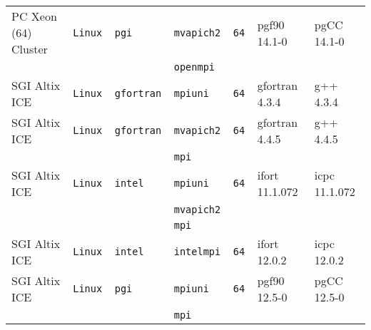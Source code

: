 \begin{longtable}{lllllll}
PC Xeon (64) Cluster  &\tt Linux  &\tt pgi          &\tt mvapich2   &\tt 64              & pgf90 \footnotesize 14.1-0         & pgCC \footnotesize 14.1-0       \\ %
                      &           &                 &\tt openmpi    &                    &                                    &                                 \\
SGI Altix ICE         &\tt Linux  &\tt gfortran     &\tt mpiuni     &\tt 64              & gfortran \footnotesize 4.3.4       & g++ \footnotesize 4.3.4         \\ %
SGI Altix ICE         &\tt Linux  &\tt gfortran     &\tt mvapich2   &\tt 64              & gfortran \footnotesize 4.4.5       & g++ \footnotesize 4.4.5         \\ %
                      &           &                 &\tt mpi        &                    &                                    &                                 \\
SGI Altix ICE         &\tt Linux  &\tt intel        &\tt mpiuni     &\tt 64              & ifort \footnotesize 11.1.072       & icpc \footnotesize 11.1.072     \\ %
                      &           &                 &\tt mvapich2   &                    &                                    &                                 \\
                      &           &                 &\tt mpi        &                    &                                    &                                 \\
SGI Altix ICE         &\tt Linux  &\tt intel        &\tt intelmpi   &\tt 64              & ifort \footnotesize 12.0.2         & icpc \footnotesize 12.0.2       \\ %
SGI Altix ICE         &\tt Linux  &\tt pgi          &\tt mpiuni     &\tt 64              & pgf90 \footnotesize 12.5-0         & pgCC \footnotesize 12.5-0       \\ %
                      &           &                 &\tt mpi        &                    &                                    &                                 \\

\end{longtable}
